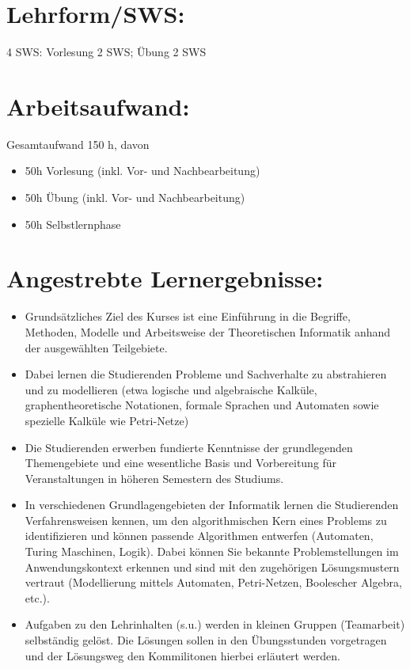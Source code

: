 \section*{Lehrform/SWS:}\label{lehrformsws-23}

4 SWS: Vorlesung 2 SWS; Übung 2 SWS

\section*{Arbeitsaufwand:}\label{arbeitsaufwand-22}

Gesamtaufwand 150 h, davon

\begin{itemize}
\tightlist
\item
  50h Vorlesung (inkl. Vor- und Nachbearbeitung)
\item
  50h Übung (inkl. Vor- und Nachbearbeitung)
\item
  50h Selbstlernphase
\end{itemize}

\section*{Angestrebte
Lernergebnisse:}\label{angestrebte-lernergebnisse-23}

\begin{itemize}
\tightlist
\item
  Grundsätzliches Ziel des Kurses ist eine Einführung in die Begriffe,
  Methoden, Modelle und Arbeitsweise der Theoretischen Informatik anhand
  der ausgewählten Teilgebiete.
\item
  Dabei lernen die Studierenden Probleme und Sachverhalte zu
  abstrahieren und zu modellieren (etwa logische und algebraische
  Kalküle, graphentheoretische Notationen, formale Sprachen und
  Automaten sowie spezielle Kalküle wie Petri-Netze)
\item
  Die Studierenden erwerben fundierte Kenntnisse der grundlegenden
  Themengebiete und eine wesentliche Basis und Vorbereitung für
  Veranstaltungen in höheren Semestern des Studiums.
\item
  In verschiedenen Grundlagengebieten der Informatik lernen die
  Studierenden Verfahrensweisen kennen, um den algorithmischen Kern
  eines Problems zu identifizieren und können passende Algorithmen
  entwerfen (Automaten, Turing Maschinen, Logik). Dabei können Sie
  bekannte Problemstellungen im Anwendungskontext erkennen und sind mit
  den zugehörigen Lösungsmustern vertraut (Modellierung mittels
  Automaten, Petri-Netzen, Boolescher Algebra, etc.).
\item
  Aufgaben zu den Lehrinhalten (s.u.) werden in kleinen Gruppen
  (Teamarbeit) selbständig gelöst. Die Lösungen sollen in den
  Übungsstunden vorgetragen und der Lösungsweg den Kommilitonen hierbei
  erläutert werden.
\end{itemize}

